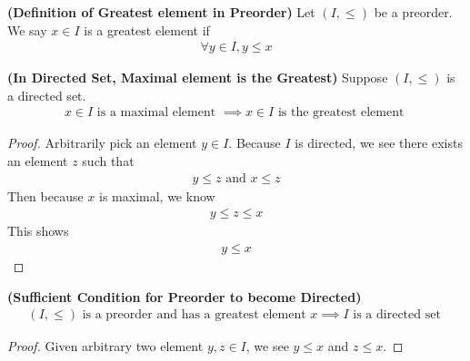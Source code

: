 \documentclass{report}
\begin{document}
\begin{definition}
\label{1.1.6}
\textbf{(Definition of Greatest element in Preorder)} Let  $(I,\leq )$ be a preorder. We say $x \in I$ is a greatest element if 
\begin{align*}
\forall y\in I, y\leq x
\end{align*}
\end{definition}
\begin{theorem}
\label{1.1.7}
\textbf{(In Directed Set, Maximal element is the Greatest)} Suppose $(I,\leq )$ is a directed set. 
 \begin{align*}
x\in I\text{ is a maximal element }\implies x\in I\text{ is the greatest element }
\end{align*}
\end{theorem}
\begin{proof}
Arbitrarily pick an element $y\in I$. Because  $I$ is directed, we see there exists  an element $z$ such that 
 \begin{align*}
y\leq z\text{ and }x\leq z
\end{align*}
Then because $x$ is maximal, we know 
\begin{align*}
y\leq z\leq x
\end{align*}
This shows 
\begin{align*}
y\leq x
\end{align*}
\end{proof}
\begin{theorem}
\label{1.1.8}
\textbf{(Sufficient Condition for Preorder to become Directed)} 
\begin{align*}
  (I,\leq )\text{ is a preorder and has a greatest element }x\implies I\text{ is a directed set }
\end{align*}
\end{theorem}
\begin{proof}
Given arbitrary two element $y,z \in I$, we see $y\leq x$ and $z\leq x$. 
\end{proof}
\end{document}
